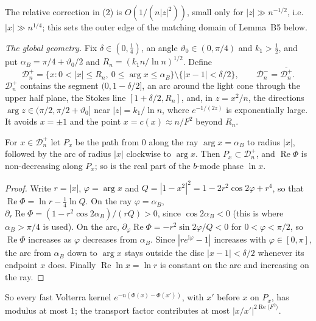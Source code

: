 \documentclass{amsart}
\numberwithin{equation}{section}
\theoremstyle{plain}
\newenvironment{lemnamed}[1]{\renewcommand\theinnerlem{#1}\innerlem}{\endinnerlem}
\theoremstyle{definition}
\theoremstyle{remark}
\newcommand{\re}{\operatorname{Re}}
\newcommand{\iu}{\mathrm{i}}
\begin{document}
The relative correction in (2) is $O(1/(n|z|^2))$, small only for $|z| \gg n^{-1/2}$, i.e.\ $|x| \gg n^{1/4}$; this sets the
outer edge of the matching domain of Lemma~B5 below.

\medskip
\emph{The global geometry.} Fix $\delta \in (0, \tfrac14)$, an angle $\vartheta_0 \in (0, \pi/4)$ and $k_1 > \tfrac12$, and put
$\alpha_B = \pi/4 + \vartheta_0/2$ and $R_n = (k_1 n/\ln n)^{1/2}$. Define
\begin{equation}\label{eq:Dn}
\mathcal D^+_n = \big\{x : 0 < |x| \le R_n,\ 0 \le \arg x \le \alpha_B\big\} \setminus \big\{|x - 1| < \delta/2\big\}, \qquad
\mathcal D^-_n = \overline{\mathcal D^+_n}.
\end{equation}
$\mathcal D^+_n$ contains the segment $(0, 1 - \delta/2]$, an arc around the light cone through the upper half plane, the
Stokes line $[1 + \delta/2, R_n]$, and, in $z = x^2/n$, the directions $\arg z \in (\pi/2, \pi/2 + \vartheta_0]$ near
$|z| = k_1/\ln n$, where $e^{-1/(2z)}$ is exponentially large. It avoids $x = \pm1$ and the point $x = c(x) \approx n/F^2$
beyond $R_n$.

\begin{lemnamed}{B8.1 (progressive paths)}\label{lem:B81}
For $x \in \mathcal D^+_n$ let $P_x$ be the path from $0$ along the ray $\arg x = \alpha_B$ to radius $|x|$, followed by the arc of
radius $|x|$ clockwise to $\arg x$. Then $P_x \subset \mathcal D^+_n$, and $\re\Phi$ is non-decreasing along $P_x$; so is the
real part of the $b$-mode phase $\ln x$.
\end{lemnamed}

\begin{proof}
Write $r = |x|$, $\varphi = \arg x$ and $Q = |1 - x^2|^2 = 1 - 2r^2\cos 2\varphi + r^4$, so that $\re\Phi = \ln r - \tfrac14\ln Q$.
On the ray $\varphi = \alpha_B$, $\partial_r\re\Phi = (1 - r^2\cos 2\alpha_B)/(rQ) > 0$, since $\cos 2\alpha_B < 0$ (this is where
$\alpha_B > \pi/4$ is used). On the arc, $\partial_\varphi\re\Phi = -r^2\sin 2\varphi/Q < 0$ for $0 < \varphi < \pi/2$, so $\re\Phi$
increases as $\varphi$ decreases from $\alpha_B$. Since $|re^{\iu\varphi} - 1|$ increases with $\varphi \in [0,\pi]$, the arc
from $\alpha_B$ down to $\arg x$ stays outside the disc $|x - 1| < \delta/2$ whenever its endpoint $x$ does. Finally
$\re\ln x = \ln r$ is constant on the arc and increasing on the ray.
\end{proof}

So every fast Volterra kernel $e^{-n(\Phi(x) - \Phi(x'))}$, with $x'$ before $x$ on $P_x$, has modulus at most $1$; the
transport factor contributes at most $|x/x'|^{2\re\langle F^2\rangle}$.
\end{document}
